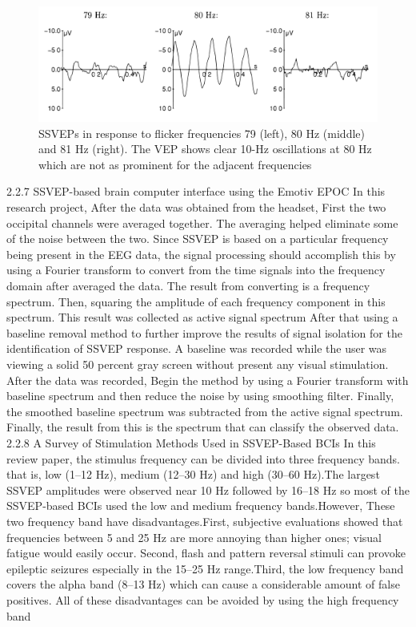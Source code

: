\begin{figure}[h]
	\centering
  	\includegraphics[scale = 0.25]{chapter2/28.pdf}
  	\caption{ SSVEPs in response to flicker frequencies 79 (left), 80 Hz (middle) and 81 Hz (right). The VEP shows clear 10-Hz oscillations at 80 Hz which are not as prominent for the adjacent frequencies}
\end{figure}


2.2.7 SSVEP-based brain computer interface using the Emotiv EPOC\cite{ssv}
In this research project, After the data was obtained from the headset, First the two occipital channels were averaged together. The averaging helped eliminate some of the noise between the two. Since SSVEP is based on a particular frequency being present in the EEG data, the signal processing should accomplish this by using a Fourier transform to convert from the time signals into the frequency domain after averaged the data. The result from converting is a frequency spectrum. Then, squaring the amplitude of each frequency component in this spectrum. This result was collected as active signal spectrum      After that using a baseline removal method to further improve the results of signal isolation for the identification of SSVEP response. A baseline was recorded while the user was viewing a solid 50 percent gray screen without present any visual stimulation. After the data was recorded, Begin the method by using a Fourier transform with baseline spectrum and then reduce the noise by using smoothing filter. Finally, the smoothed baseline spectrum was subtracted from the active signal spectrum. Finally, the result from this is the spectrum that can classify the observed data.\\ 

2.2.8 A Survey of Stimulation Methods Used in SSVEP-Based BCIs\cite{sur}
In this review paper, the stimulus frequency can be divided into three frequency bands. that is, low (1–12 Hz), medium (12–30 Hz) and high (30–60 Hz).The largest SSVEP amplitudes were observed near 10 Hz followed by 16–18 Hz so most of the SSVEP-based BCIs used the low and medium frequency bands.However, These two frequency band have disadvantages.First, subjective evaluations showed that frequencies between 5 and 25 Hz are more annoying than higher ones; visual fatigue would easily occur. Second, flash and pattern reversal stimuli can
provoke epileptic seizures especially in the 15–25 Hz range.Third, the low frequency band covers the alpha band (8–13 Hz) which can cause a considerable amount of false positives. All of these disadvantages can be avoided by using the high frequency band    
